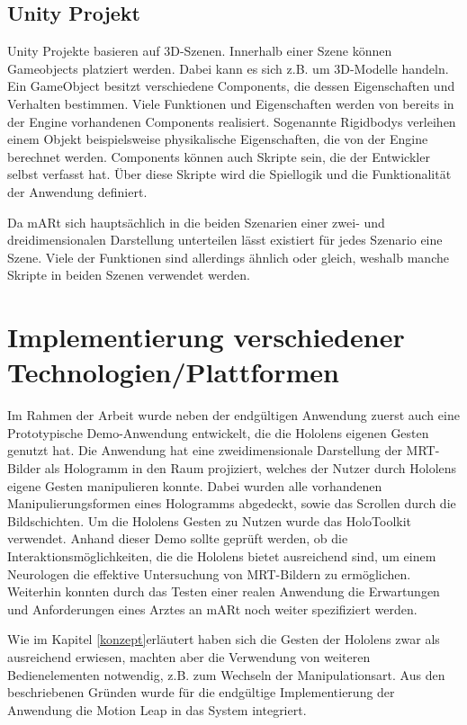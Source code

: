 \subsection{Unity Projekt}

Unity Projekte basieren auf 3D-Szenen. Innerhalb einer Szene können Gameobjects platziert werden. Dabei kann es sich z.B. um 3D-Modelle handeln. Ein GameObject besitzt verschiedene Components, die dessen Eigenschaften und Verhalten bestimmen. Viele Funktionen und Eigenschaften werden von bereits in der Engine vorhandenen Components realisiert. Sogenannte Rigidbodys verleihen einem Objekt beispielsweise physikalische Eigenschaften, die von der Engine berechnet werden. Components können auch Skripte sein, die der Entwickler selbst verfasst hat. Über diese Skripte wird die Spiellogik und die Funktionalität der Anwendung definiert. 

Da mARt sich hauptsächlich in die beiden Szenarien einer zwei- und dreidimensionalen Darstellung unterteilen lässt existiert für jedes Szenario eine Szene.
Viele der Funktionen sind allerdings ähnlich oder gleich, weshalb manche Skripte in beiden Szenen verwendet werden. 


\section{Implementierung verschiedener Technologien/Plattformen}
\label{plattformen}

Im Rahmen der Arbeit wurde neben der endgültigen Anwendung zuerst auch eine Prototypische Demo-Anwendung entwickelt, die die Hololens eigenen Gesten genutzt hat. Die Anwendung hat eine zweidimensionale Darstellung der MRT-Bilder als Hologramm in den Raum projiziert, welches der Nutzer durch Hololens eigene Gesten manipulieren konnte. Dabei wurden alle vorhandenen Manipulierungsformen eines Hologramms abgedeckt, sowie das Scrollen durch die Bildschichten. Um die Hololens Gesten zu Nutzen wurde das HoloToolkit verwendet. 
Anhand dieser Demo sollte geprüft werden, ob die Interaktionsmöglichkeiten, die die Hololens bietet ausreichend sind, um einem Neurologen die effektive Untersuchung von MRT-Bildern zu ermöglichen.
Weiterhin konnten durch das Testen einer realen Anwendung die Erwartungen und Anforderungen eines Arztes an mARt noch weiter spezifiziert werden.  

Wie im Kapitel \ref{konzept}erläutert haben sich die Gesten der Hololens zwar als ausreichend erwiesen, machten aber die Verwendung von weiteren Bedienelementen notwendig, z.B. zum Wechseln der Manipulationsart. Aus den beschriebenen Gründen wurde für die endgültige Implementierung der Anwendung die Motion Leap in das System integriert.

